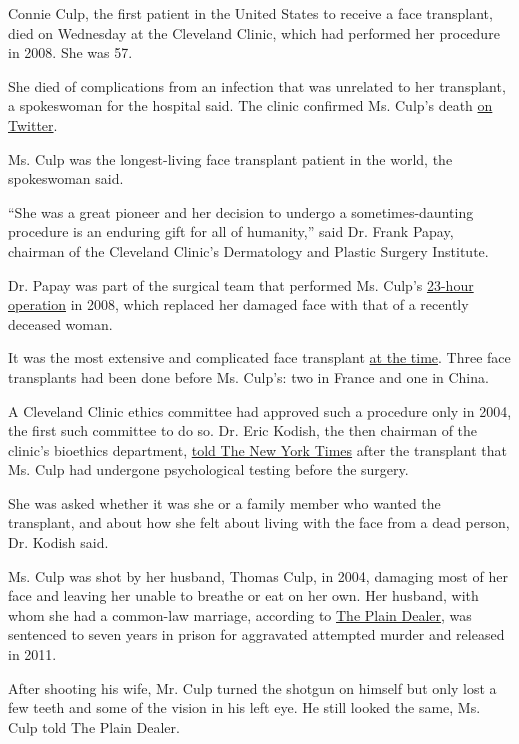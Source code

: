 Connie Culp, the first patient in the United States to receive a face
transplant, died on Wednesday at the Cleveland Clinic, which had
performed her procedure in 2008. She was 57.

She died of complications from an infection that was unrelated to her
transplant, a spokeswoman for the hospital said. The clinic confirmed
Ms. Culp's death
\href{https://twitter.com/CleClinicNews/status/1289217253158731777?s=20}{on
Twitter}.

Ms. Culp was the longest-living face transplant patient in the world,
the spokeswoman said.

``She was a great pioneer and her decision to undergo a
sometimes-daunting procedure is an enduring gift for all of humanity,''
said Dr. Frank Papay, chairman of the Cleveland Clinic's Dermatology and
Plastic Surgery Institute.

Dr. Papay was part of the surgical team that performed Ms. Culp's
\href{https://www.nytimes.com/2008/12/18/health/s18face.html}{23-hour
operation} in 2008, which replaced her damaged face with that of a
recently deceased woman.

It was the most extensive and complicated face transplant
\href{https://www.nytimes.com/2008/12/17/health/17face.html}{at the
time}. Three face transplants had been done before Ms. Culp's: two in
France and one in China.

A Cleveland Clinic ethics committee had approved such a procedure only
in 2004, the first such committee to do so. Dr. Eric Kodish, the then
chairman of the clinic's bioethics department,
\href{https://www.nytimes.com/2008/12/18/health/s18face.html}{told The
New York Times} after the transplant that Ms. Culp had undergone
psychological testing before the surgery.

She was asked whether it was she or a family member who wanted the
transplant, and about how she felt about living with the face from a
dead person, Dr. Kodish said.

Ms. Culp was shot by her husband, Thomas Culp, in 2004, damaging most of
her face and leaving her unable to breathe or eat on her own. Her
husband, with whom she had a common-law marriage, according to
\href{https://www.cleveland.com/healthfit/2010/11/woman_who_underwent_first_near.html}{The
Plain Dealer}, was sentenced to seven years in prison for aggravated
attempted murder and released in 2011.

After shooting his wife, Mr. Culp turned the shotgun on himself but only
lost a few teeth and some of the vision in his left eye. He still looked
the same, Ms. Culp told The Plain Dealer.

